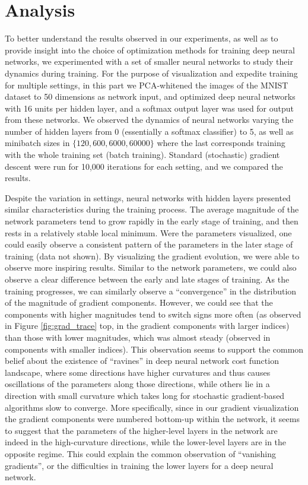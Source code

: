 \section{Analysis}

To better understand the results observed in our experiments, as well as to provide insight
into the choice of optimization methods for training deep neural networks, we experimented 
with a set of smaller neural networks to study their dynamics during training. For the purpose 
of visualization and expedite training for multiple settings, in this part we PCA-whitened the 
images of the MNIST dataset to 50 dimensions as network input, and optimized deep neural 
networks with 16 units per hidden layer, and a softmax output layer was used for output 
from these networks. We observed the dynamics of neural networks varying the number of 
hidden layers from 0 (essentially a softmax classifier) to 5, as well as minibatch sizes in 
$\{120, 600, 6000, 60000\}$ where the last corresponds training with the whole training set 
(batch training). Standard (stochastic) gradient descent were run for 10,000 iterations for 
each setting, and we compared the results.

Despite the variation in settings, neural networks with hidden layers presented similar 
characteristics during the training process. The average magnitude of the network 
parameters tend to grow rapidly in the early stage of training, and then rests in a relatively 
stable local minimum. Were the parameters visualized, one could easily observe a consistent 
pattern of the parameters in the later stage of training (data not shown). By visualizing the 
gradient evolution, we were able to observe more inspiring results. Similar to the network
parameters, we could also observe a clear difference between the early and late stages of
training. As the training progresses, we can similarly observe a ``convergence'' in the 
distribution of the magnitude of gradient components. However, we could see that the 
components with higher magnitudes tend to switch signs more often (as observed in Figure 
\ref{fig:grad_trace} top, in the gradient components with larger indices) than those with
lower magnitudes, which was almost steady (observed in components with smaller indices).
This observation seems to support the common belief about the existence of ``ravines'' in 
deep neural network cost function landscape, where some directions have higher 
curvatures and thus causes oscillations of the parameters along those directions, while 
others lie in a direction with small curvature which takes long for stochastic 
gradient-based algorithms slow to converge. More specifically, since in our gradient
visualization the gradient components were numbered bottom-up within the network,
it seems to suggest that the parameters of the higher-level layers in the network are
indeed in the high-curvature directions, while the lower-level layers are in the opposite
regime. This could explain the common observation of ``vanishing gradients'', or the 
difficulties in training the lower layers for a deep neural network.

